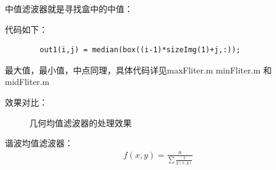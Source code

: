 \documentclass{article}
\begin{document}
    中值滤波器就是寻找盒中的中值：

    代码如下：
    \begin{lstlisting}
        out1(i,j) = median(box((i-1)*sizeImg(1)+j,:));
    \end{lstlisting}

    最大值，最小值，中点同理，具体代码详见maxFliter.m minFliter.m 和 midFliter.m

    效果对比：
    \begin{figure}[]
        \centering
        \caption{几何均值滤波器的处理效果}
    \end{figure}

    谐波均值滤波器：
    \begin{align}
        f(x,y) = \frac{n}{\sum \frac{1}{g(x,y)}} 
    \end{align}
\end{document}
